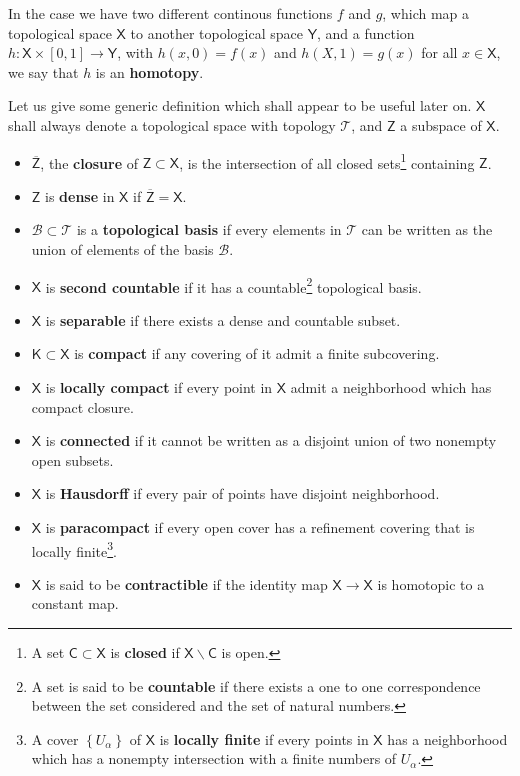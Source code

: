 \documentclass[10pt]{book}
\newcommand{\Bcal}{\mathcal{B}}
\newcommand{\Tcal}{\mathcal{T}}
\newcommand{\Csf}{\mathsf{C}}
\newcommand{\Ksf}{\mathsf{K}}
\newcommand{\Xsf}{\mathsf{X}}
\newcommand{\Ysf}{\mathsf{Y}}
\newcommand{\Zsf}{\mathsf{Z}}
\theoremstyle{break}
\begin{document}
\bigskip


In the case we have two different continous functions $f$ and $g$, which map a topological space $\Xsf$ to another topological space $\Ysf$, and a function $h : \Xsf \times [0,1] \to \Ysf$, with  $h(x,0) = f(x)$ and $h(X,1) = g(x)$ for all $x \in \Xsf$, we say that $h$ is an \textbf{homotopy}.


\bigskip


Let us give some generic definition which shall appear to be useful later on. $\Xsf$ shall always denote a topological space with topology $\Tcal$, and $\Zsf$ a subspace of $\Xsf$.%


\begin{itemize}
%
\item $\overline{\Zsf}$, the \textbf{closure} of $\Zsf \subset \Xsf$, is the intersection of all closed sets\footnote{A set $\Csf \subset \Xsf$ is \textbf{closed} if $\Xsf \backslash \Csf$ is open.} containing $\Zsf$.%
%
\item $\Zsf$ is \textbf{dense} in $\Xsf$ if $\overline{\Zsf} = \Xsf$.%
%
\item $\Bcal \subset \Tcal$ is a \textbf{topological basis} if every elements in $\Tcal$ can be written as the union of elements of the basis $\Bcal$.%
%
\item $\Xsf$ is \textbf{second countable} if it has a countable\footnote{A set is said to be \textbf{countable} if there exists a one to one correspondence between the set considered and the set of natural numbers.} topological basis.%
%
\item $\Xsf$ is \textbf{separable} if there exists a dense and countable subset.%
%
\item $\Ksf \subset \Xsf$ is \textbf{compact} if any covering of it admit a finite subcovering.%
%
\item $\Xsf$ is \textbf{locally compact} if every point in $\Xsf$ admit a neighborhood which has compact closure.%
%
\item $\Xsf$ is \textbf{connected} if it cannot be written as a disjoint union of two nonempty open subsets.%
%
\item $\Xsf$ is \textbf{Hausdorff} if every pair of points have disjoint neighborhood.%
%
\item $\Xsf$ is \textbf{paracompact} if every open cover has a refinement covering that is locally finite\footnote{A cover $\left\{U_\alpha\right\}$ of $\Xsf$ is \textbf{locally finite} if every points in $\Xsf$ has a neighborhood which has a nonempty intersection with a finite numbers of $U_\alpha$.}.%
%
\item $\Xsf$ is said to be \textbf{contractible} if the identity map $\Xsf \to \Xsf$ is homotopic to a constant map.
\end{itemize}
\end{document}
